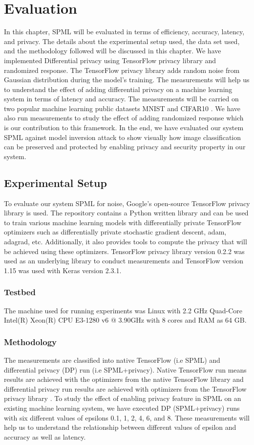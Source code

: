\chapter{Evaluation}
\label{sec:eval}
In this chapter, SPML will be evaluated in terms of efficiency, accuracy, latency, and privacy. The details about the experimental setup used, the data set used, and the methodology followed will be discussed in this chapter. We have implemented Differential privacy using TensorFlow privacy library \cite{11} and randomized response. The TensorFlow privacy library adds random noise from Gaussian distribution during the model's training. The measurements will help us to understand the effect of adding differential privacy on a machine learning system in terms of latency and accuracy. The measurements will be carried on two popular machine learning public datasets MNIST \cite{12} and CIFAR10 \cite{13}. We have also run measurements to study the effect of adding randomized response which is our contribution to this framework. In the end, we have evaluated our system SPML against model inversion attack to show visually how image classification can be preserved and protected by enabling privacy and security property in our system.

\section{Experimental Setup}
To evaluate our system SPML for noise, Google's open-source TensorFlow privacy library is used. The repository \cite{11} contains a Python written library and can be used to train various machine learning models with differentially private TensorFlow optimizers such as differentially private stochastic gradient descent, adam, adagrad, etc. Additionally, it also provides tools to compute the privacy that will be achieved using these optimizers. TensorFlow privacy library version 0.2.2 was used as an underlying library to conduct measurements and TensorFlow version 1.15 was used with Keras version 2.3.1. 
\subsection{Testbed}
The machine used for running experiments was Linux with 2.2 GHz Quad-Core Intel(R) Xeon(R) CPU E3-1280 v6 @ 3.90GHz with 8 cores and RAM as 64 GB. 
\subsection{Methodology}
The measurements are classified into native TensorFlow (i.e SPML) and differential privacy (DP) run (i.e SPML+privacy). Native TensorFlow run means results are achieved with the optimizers from the native TensorFlow library \cite{46} and differential privacy run results are achieved with optimizers from the TensorFlow privacy library \cite{11}. To study the effect of enabling privacy feature in SPML on an existing machine learning system, we have executed DP (SPML+privacy) runs with six different values of epsilons 0.1, 1, 2, 4, 6, and 8. These measurements will help us to understand the relationship between different values of epsilon and accuracy as well as latency.

